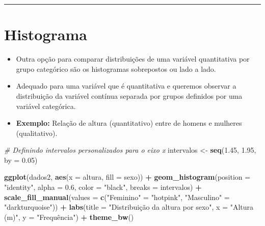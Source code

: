 \documentclass[
]{book}
\newenvironment{Shaded}{\begin{snugshade}}{\end{snugshade}}
\newcommand{\AttributeTok}[1]{\textcolor[rgb]{0.13,0.29,0.53}{#1}}
\newcommand{\CommentTok}[1]{\textcolor[rgb]{0.56,0.35,0.01}{\textit{#1}}}
\newcommand{\FloatTok}[1]{\textcolor[rgb]{0.00,0.00,0.81}{#1}}
\newcommand{\FunctionTok}[1]{\textcolor[rgb]{0.13,0.29,0.53}{\textbf{#1}}}
\newcommand{\NormalTok}[1]{#1}
\newcommand{\OtherTok}[1]{\textcolor[rgb]{0.56,0.35,0.01}{#1}}
\newcommand{\SpecialCharTok}[1]{\textcolor[rgb]{0.81,0.36,0.00}{\textbf{#1}}}
\newcommand{\StringTok}[1]{\textcolor[rgb]{0.31,0.60,0.02}{#1}}
\begin{document}
\begin{center}\rule{0.5\linewidth}{0.5pt}\end{center}

\section{Histograma}\label{histograma-1}

\begin{itemize}
\item
  Outra opção para comparar distribuições de uma variável quantitativa por grupo categórico são os histogramas sobrepostos ou lado a lado.
\item
  Adequado para uma variável que é quantitativa e queremos observar a distribuição da variável contínua separada por grupos definidos por uma variável categórica.
\item
  \textbf{Exemplo:} Relação de altura (quantitativo) entre de homens e mulheres (qualitativo).
\end{itemize}

\begin{Shaded}
\begin{Highlighting}[]
\CommentTok{\# Definindo intervalos personalizados para o eixo x}
\NormalTok{intervalos }\OtherTok{\textless{}{-}} \FunctionTok{seq}\NormalTok{(}\FloatTok{1.45}\NormalTok{, }\FloatTok{1.95}\NormalTok{, }\AttributeTok{by =} \FloatTok{0.05}\NormalTok{)}

\FunctionTok{ggplot}\NormalTok{(dados2, }\FunctionTok{aes}\NormalTok{(}\AttributeTok{x =}\NormalTok{ altura, }\AttributeTok{fill =}\NormalTok{ sexo)) }\SpecialCharTok{+}
  \FunctionTok{geom\_histogram}\NormalTok{(}\AttributeTok{position =} \StringTok{"identity"}\NormalTok{, }\AttributeTok{alpha =} \FloatTok{0.6}\NormalTok{, }\AttributeTok{color =} \StringTok{"black"}\NormalTok{, }
                 \AttributeTok{breaks =}\NormalTok{ intervalos) }\SpecialCharTok{+}
  \FunctionTok{scale\_fill\_manual}\NormalTok{(}\AttributeTok{values =} \FunctionTok{c}\NormalTok{(}\StringTok{"Feminino"} \OtherTok{=} \StringTok{"hotpink"}\NormalTok{,  }
                               \StringTok{"Masculino"} \OtherTok{=} \StringTok{"darkturquoise"}\NormalTok{)) }\SpecialCharTok{+} 
  \FunctionTok{labs}\NormalTok{(}\AttributeTok{title =} \StringTok{"Distribuição da altura por sexo"}\NormalTok{, }\AttributeTok{x =} \StringTok{"Altura (m)"}\NormalTok{, }\AttributeTok{y =} \StringTok{"Frequência"}\NormalTok{) }\SpecialCharTok{+}
  \FunctionTok{theme\_bw}\NormalTok{()}
\end{Highlighting}
\end{Shaded}
\end{document}
